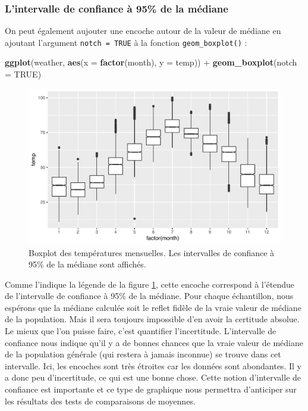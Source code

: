 \documentclass[
  a4paper,
]{article}
\newenvironment{Shaded}{\begin{snugshade}}{\end{snugshade}}
\newcommand{\DataTypeTok}[1]{\textcolor[rgb]{0.00,0.34,0.68}{#1}}
\newcommand{\KeywordTok}[1]{\textcolor[rgb]{0.12,0.11,0.11}{\textbf{#1}}}
\newcommand{\NormalTok}[1]{\textcolor[rgb]{0.12,0.11,0.11}{#1}}
\newcommand{\OperatorTok}[1]{\textcolor[rgb]{0.12,0.11,0.11}{#1}}
\newcommand{\OtherTok}[1]{\textcolor[rgb]{0.00,0.43,0.16}{#1}}
\newcommand{\StringTok}[1]{\textcolor[rgb]{0.75,0.01,0.01}{#1}}
\begin{document}
\hypertarget{lintervalle-de-confiance-uxe0-95-de-la-muxe9diane}{%
\subsubsection{L'intervalle de confiance à 95\% de la médiane}\label{lintervalle-de-confiance-uxe0-95-de-la-muxe9diane}}

On peut également aujouter une encoche autour de la valeur de médiane en ajoutant l'argument \texttt{notch\ =\ TRUE} à la fonction \texttt{geom\_boxplot()} :

\begin{Shaded}
\begin{Highlighting}[]
\KeywordTok{ggplot}\NormalTok{(weather, }\KeywordTok{aes}\NormalTok{(}\DataTypeTok{x =} \KeywordTok{factor}\NormalTok{(month), }\DataTypeTok{y =}\NormalTok{ temp)) }\OperatorTok{+}
\StringTok{  }\KeywordTok{geom_boxplot}\NormalTok{(}\DataTypeTok{notch =} \OtherTok{TRUE}\NormalTok{)}
\end{Highlighting}
\end{Shaded}

\begin{figure}[htpb]

{\centering \includegraphics[width=0.9\linewidth]{figure/notchedboxplot-1} 

}

\caption{Boxplot des températures mensuelles. Les intervalles de confiance à 95\% de la médiane sont affichés.}\label{fig:notchedboxplot}
\end{figure}



Comme l'indique la légende de la figure \ref{fig:notchedboxplot}, cette encoche correspond à l'étendue de l'intervalle de confiance à 95\% de la médiane. Pour chaque échantillon, nous espérons que la médiane calculée soit le reflet fidèle de la vraie valeur de médiane de la population. Mais il sera toujours impossible d'en avoir la certitude absolue. Le mieux que l'on puisse faire, c'est quantifier l'incertitude. L'intervalle de confiance nous indique qu'il y a de bonnes chances que la vraie valeur de médiane de la population générale (qui restera à jamais inconnue) se trouve dans cet intervalle. Ici, les encoches sont très étroites car les données sont abondantes. Il y a donc peu d'incertitude, ce qui est une bonne chose. Cette notion d'intervalle de confiance est importante et ce type de graphique nous permettra d'anticiper sur les résultats des tests de comparaisons de moyennes.
\end{document}
